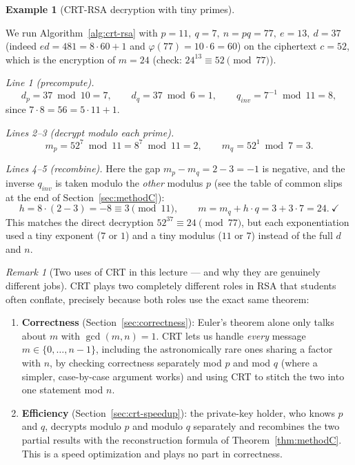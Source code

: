 \documentclass[11pt]{article}
\theoremstyle{definition}
\newtheorem{example}[theorem]{Example}
\theoremstyle{remark}
\newtheorem{remark}[theorem]{Remark}
\begin{document}
\begin{example}[CRT-RSA decryption with tiny primes]\label{ex:crt-rsa-tiny}

We run Algorithm~\ref{alg:crt-rsa} with $p=11,\ q=7,\ n=pq=77,\ e=13,\ d=37$ (indeed $ed=481=8\cdot60+1$ and $\varphi(77)=10\cdot6=60$) on the ciphertext $c=52$, which is the encryption of $m=24$ (check: $24^{13}\equiv52\pmod{77}$).

\emph{Line 1 (precompute).}
\[
d_p=37\bmod10=7,\qquad d_q=37\bmod6=1,\qquad q_{inv}=7^{-1}\bmod11=8,
\]
since $7\cdot8=56=5\cdot11+1$.

\emph{Lines 2--3 (decrypt modulo each prime).}
\[
m_p=52^{7}\bmod11=8^7\bmod11=2,\qquad m_q=52^{1}\bmod7=3.
\]


\emph{Lines 4--5 (recombine).} Here the gap $m_p-m_q=2-3=-1$ is negative, and the inverse $q_{inv}$ is taken modulo the \emph{other} modulus $p$ (see the table of common slips at the end of Section~\ref{sec:methodC}):
\[
h=8\cdot(2-3)=-8\equiv3\pmod{11},\qquad m=m_q+h\cdot q=3+3\cdot7=24.\ \checkmark
\]
This matches the direct decryption $52^{37}\equiv24\pmod{77}$, but each exponentiation used a tiny exponent ($7$ or $1$) and a tiny modulus ($11$ or $7$) instead of the full $d$ and $n$.
\end{example}



\begin{remark}[Two uses of CRT in this lecture --- and why they are genuinely different jobs]
CRT plays two completely different roles in RSA that students often conflate, precisely because both roles use the exact same theorem:
\begin{enumerate}
\item \textbf{Correctness} (Section~\ref{sec:correctness}): Euler's theorem alone only talks about $m$ with $\gcd(m,n)=1$. CRT lets us handle \emph{every} message $m\in\{0,\dots,n-1\}$, including the astronomically rare ones sharing a factor with $n$, by checking correctness separately mod $p$ and mod $q$ (where a simpler, case-by-case argument works) and using CRT to stitch the two into one statement mod $n$.
\item \textbf{Efficiency} (Section~\ref{sec:crt-speedup}): the private-key holder, who knows $p$ and $q$, decrypts modulo $p$ and modulo $q$ separately and recombines the two partial results with the reconstruction formula of Theorem~\ref{thm:methodC}. This is a speed optimization and plays no part in correctness.


\end{enumerate}
\end{remark}
\end{document}
